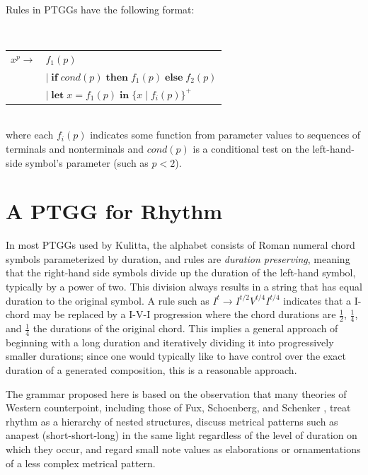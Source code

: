 \documentclass{article}
\begin{document}
Rules in PTGGs have the following format:

$\;$ \\
\begin{tabular}{ll}
$x^p \rightarrow$ & $f_{1}(p)$ \\
$\;$ & $ \vert \;  \textbf{if} \; cond(p) \; \textbf{then} \; f_{1}(p) \; \textbf{else} \; f_{2}(p)$ \\
$\;$ & $\vert \; \textbf{let} \; x = f_{1}(p) \; \textbf{in} \; \{x \; | \; f_{i}(p)\}^{+}$ \\
\end{tabular} $\;$ \\

\noindent where each $f_{i}(p)$ indicates some function from parameter values to sequences of terminals and nonterminals and $cond(p)$ is a conditional test on the left-hand-side symbol's parameter (such as $p<2$).


\section{A PTGG for Rhythm}


In most PTGGs used by Kulitta, the alphabet consists of Roman numeral chord symbols parameterized by duration, and rules are \emph{duration preserving}, meaning that the right-hand side symbols divide up the duration of the left-hand symbol, typically by a power of two. This division always results in a string that has equal duration to the original symbol. A rule such as $I^{t} \rightarrow I^{t/2} V^{t/4} I^{t/4}$ indicates that a I-chord may be replaced by a I-V-I progression where the chord durations are $\frac{1}{2}$, $\frac{1}{4}$, and $\frac{1}{4}$ the durations of the original chord. This implies a general approach of beginning with a long duration and iteratively dividing it into progressively smaller durations; since one would typically like to have control over the exact duration of a generated composition, this is a reasonable approach.

The grammar proposed here is based on the observation that many theories of Western counterpoint, including those of Fux, Schoenberg, and Schenker \cite{[TO-DO]}, treat rhythm as a hierarchy of nested structures, discuss metrical patterns such as anapest (short-short-long) in the same light regardless of the level of duration on which they occur, and regard small note values as elaborations or ornamentations of a less complex metrical pattern.
\end{document}

